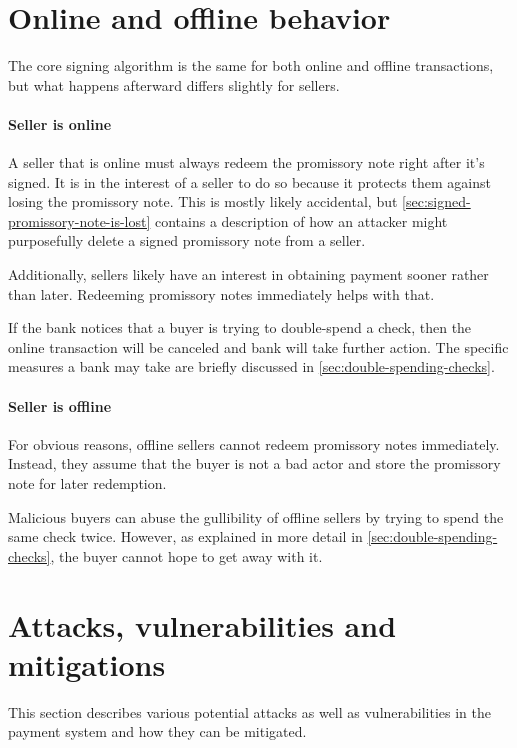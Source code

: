 \documentclass[12pt,a4paper]{article}
\begin{document}
\begin{multicols}{2}
  

	\section{Online and offline behavior}

	The core signing algorithm is the same for both online and offline transactions, but what happens afterward differs slightly for sellers.

	\paragraph{Seller is online}
	
	A seller that is online must always redeem the promissory note right after it's signed. It is in the interest of a seller to do so because it protects them against losing the promissory note. This is mostly likely accidental, but \autoref{sec:signed-promissory-note-is-lost} contains a description of how an attacker might purposefully delete a signed promissory note from a seller.

	Additionally, sellers likely have an interest in obtaining payment sooner rather than later. Redeeming promissory notes immediately helps with that.

	If the bank notices that a buyer is trying to double-spend a check, then the online transaction will be canceled and bank will take further action. The specific measures a bank may take are briefly discussed in \autoref{sec:double-spending-checks}.
	
	\paragraph{Seller is offline}
	
	For obvious reasons, offline sellers cannot redeem promissory notes immediately. Instead, they assume that the buyer is not a bad actor and store the promissory note for later redemption.

	Malicious buyers can abuse the gullibility of offline sellers by trying to spend the same check twice. However, as explained in more detail in \autoref{sec:double-spending-checks}, the buyer cannot hope to get away with it.

	\section{Attacks, vulnerabilities and mitigations}

	This section describes various potential attacks as well as vulnerabilities in the payment system and how they can be mitigated.
	

\end{multicols}
\end{document}
